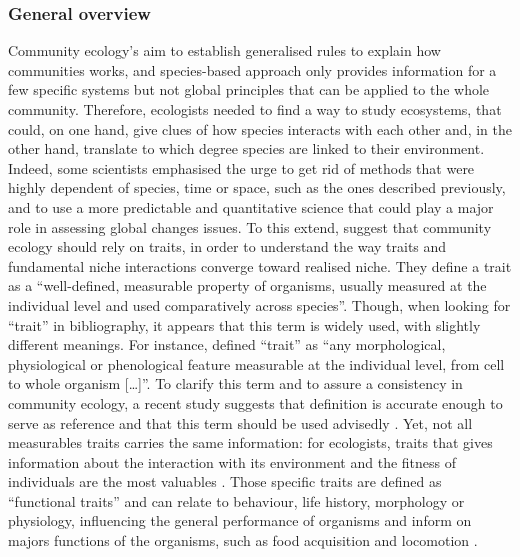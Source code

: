 \subsubsection{General overview}
Community ecology’s aim to establish generalised rules to explain how communities works, and species-based approach only provides information for a few specific systems but not global principles that can be applied to the whole community. Therefore, ecologists needed to find a way to study ecosystems, that could, on one hand, give clues of how species interacts with each other and, in the other hand, translate to which degree species are linked to their environment. Indeed, some scientists emphasised the urge to get rid of methods that were highly dependent of species, time or space, such as the ones described previously, and to use a more predictable and quantitative science that could play a major role in assessing global changes issues. To this extend, \citep{mcgill2006} suggest that community ecology should rely on traits, in order to understand the way traits and fundamental niche interactions converge toward realised niche. They define a trait as a “well-defined, measurable property of organisms, usually measured at the individual level and used comparatively across species”. Though, when looking for “trait” in bibliography, it appears that this term is widely used, with slightly different meanings. For instance, \citep{violle2007} defined “trait” as “any morphological, physiological or phenological feature measurable at the individual level, from cell to whole organism […]”. To clarify this term and to assure a consistency in community ecology, a recent study suggests that \citep{violle2007}definition is accurate enough to serve as reference and that this term should be used advisedly \citep{martini2020}. Yet, not all measurables traits carries the same information: for ecologists, traits that gives information about the interaction with its environment and the fitness of individuals are the most valuables \citep{kremer2017}. Those specific traits are defined as “functional traits” and can relate to behaviour, life history, morphology or physiology, influencing the general performance of organisms \citep{martini2020, mcgill2006} and inform on majors functions of the organisms, such as food acquisition and locomotion \citep{mejri2009}.

